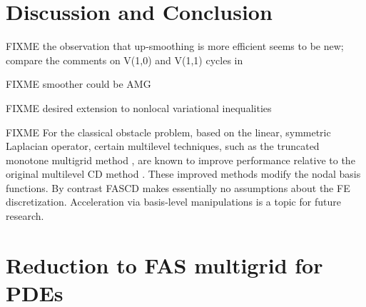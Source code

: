 \documentclass[letterpaper,final,12pt,reqno]{amsart}
\theoremstyle{cstyle}
\theoremstyle{cstyle*}
\theoremstyle{dstyle}
\numberwithin{equation}{section}
\numberwithin{figure}{section}
\numberwithin{table}{section}
\numberwithin{theorem}{section}
\begin{document}
\section{Discussion and Conclusion} \label{sec:discussion}

FIXME the observation that up-smoothing is more efficient seems to be new; compare the comments on V(1,0) and V(1,1) cycles in \cite{GraeserKornhuber2009,Tai2003}

FIXME smoother could be AMG

FIXME desired extension to nonlocal variational inequalities

FIXME For the classical obstacle problem, based on the linear, symmetric Laplacian operator, certain multilevel techniques, such as the truncated monotone multigrid method \cite{GraeserKornhuber2009,Kornhuber1994}, are known to improve performance relative to the original multilevel CD method \cite{Tai2003}.  These improved methods modify the nodal basis functions.  By contrast FASCD makes essentially no assumptions about the FE discretization.  Acceleration via basis-level manipulations is a topic for future research.






\appendix
\section{Reduction to FAS multigrid for PDEs} \label{app:reductions}
\end{document}
